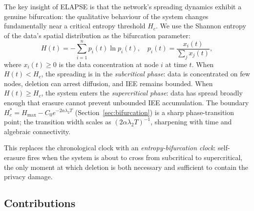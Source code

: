 \documentclass[review,12pt]{elsarticle}
\newcommand{\Hc}{H_c}
\newcommand{\Hmax}{H_{\max}}
\begin{document}
The key insight of ELAPSE is that the network's spreading dynamics exhibit
a genuine bifurcation: the qualitative behaviour of the system changes
fundamentally near a critical entropy threshold $\Hc$.  We use the Shannon
entropy of the data's spatial distribution as the bifurcation parameter:
\begin{equation}
  H(t) = -\sum_{i=1}^{n} p_i(t) \ln p_i(t), \quad
  p_i(t) = \frac{x_i(t)}{\sum_j x_j(t)},
  \label{eq:entropy}
\end{equation}
where $x_i(t) \geq 0$ is the data concentration at node $i$ at time $t$.
When $H(t) < \Hc$, the spreading is in the \emph{subcritical phase}: data is
concentrated on few nodes, deletion can arrest diffusion, and IEE remains bounded.
When $H(t) \geq \Hc$, the system enters the \emph{supercritical phase}: data has
spread broadly enough that erasure cannot prevent unbounded IEE accumulation.
The boundary $\Hc^* = \Hmax - C_0 e^{-2\alpha\lambda_2 T}$ (Section~\ref{sec:bifurcation})
is a sharp phase-transition point; the transition width scales as
$(2\alpha\lambda_2 T)^{-1}$, sharpening with time and algebraic connectivity.

This replaces the chronological clock with an \emph{entropy-bifurcation clock}:
self-erasure fires when the system is about to cross from subcritical to
supercritical, the only moment at which deletion is both necessary and
sufficient to contain the privacy damage.

\subsection{Contributions}
\end{document}
